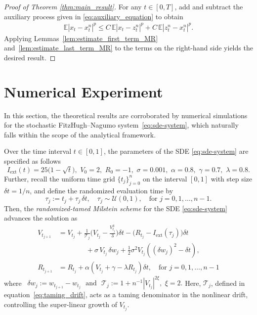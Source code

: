 \documentclass[reqno,  oneside, 12pt]{amsart}
\newcommand{\E}{\mathbb E}
\begin{document}
\begin{proof}[Proof of Theorem \ref{thm:main_result}]
	For any \( t \in [0, T] \),  add and subtract the auxiliary process given in \eqref{eq:auxiliary_equation} to obtain
	\begin{align*}
		\E|x_t - x_t^{n}|^{p} \leq C\,\E|x_t - z_t^{n}|^{p} + C\,\E|z_t^{n} - x_t^{n}|^{p}.
	\end{align*}
	Applying Lemmas~\ref{lem:estimate_first_term_MR} and~\ref{lem:estimate_last_term_MR} to the terms on the right-hand side yields the desired result.	
\end{proof}

\section{Numerical Experiment} \label{sec:numerics}
In this section, the theoretical results are corroborated by numerical simulations for the stochastic FitzHugh--Nagumo system~\eqref{eq:sde-system}, which naturally falls within the scope of the analytical framework.

Over the time interval $t \in [0,1]$, the parameters of the SDE \eqref{eq:sde-system} are specified as follows
\[
I_{\mathrm{ext}}(t) = 25\bigl(1 - \sqrt{t}\bigr), \,\,
V_0 = 2, \,\,
R_0 = -1, \,\,
\sigma = 0.001, \,\,
\alpha = 0.8, \,\,
\gamma = 0.7, \,\,
\lambda = 0.8.
\]
Further,
recall the uniform time grid \( \{t_j\}_{j=0}^n \) on the interval \([0,1]\) with step size 
\(\delta t = 1 / n\), and define the  randomized evaluation time by
\[
\tau_j := t_j + \tau_j \,\delta t, 
\quad \tau_j \sim \mathcal{U}(0,1), 
\quad \text{for } j = 0,1,\ldots,n-1.
\]
Then, the \emph{randomized-tamed Milstein scheme}  for the SDE \eqref{eq:sde-system}  advances the solution as
\begin{equation} \label{eq:tamed-milstein}
	\begin{aligned}
		V_{t_{j+1}} &= V_{t_j} 
		+ \frac{1}{\mathcal{T}_j} \Big( V_{t_j} - \tfrac{V_{t_j}^3}{3}\Big) \delta t - \Big(R_{t_j} - I_{\mathrm{ext}}(\tau_j) \Big) \delta t 
		\\&\qquad\qquad+ \sigma\, V_{t_j} \,\delta w_j 
		+ \frac{1}{2} \sigma^2 V_{t_j} \left( (\delta w_j)^2 - \delta t \right), \\[0.6em]
		R_{t_{j+1}} &= R_{t_j} 
		+ \alpha \left( V_{t_j} + \gamma - \lambda R_{t_j} \right) \delta t,  
		\quad \text{for } j=0,1,\ldots,n-1
	\end{aligned}
\end{equation}
where  \,
\(
\delta w_j := w_{t_{j+1}} - w_{t_j} \,\, \mbox{ and }
\,\, 
\mathcal{T}_j := 1 + n^{-1} |V_{t_j}|^{2\xi}, 
\,\, 
\xi = 2.
\) Here, $\mathcal{T}_j$, defined in equation~\eqref{eq:taming_drift}, acts as a taming denominator in the nonlinear drift, controlling the super-linear growth of $V_{t_j}$.
\end{document}
